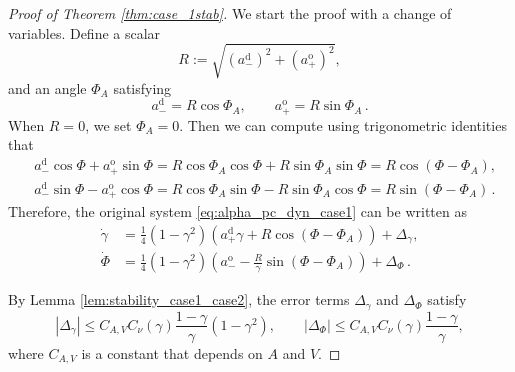 \documentclass[10pt]{article}
\theoremstyle{definition}
\theoremstyle{definition}
\numberwithin{equation}{section}
\newcommand{\aDPlus}{a_+^{\text{d}}}
\newcommand{\aDMinus}{a_-^{\text{d}}}
\newcommand{\aOPlus}{a_+^{\text{o}}}
\newcommand{\aOMinus}{a_-^{\text{o}}}
\newcommand{\DeltaGamma}{\Delta_{\gamma}}
\newcommand{\DeltaPhi}{\Delta_{\Phi}}
\newcommand{\PhiA}{\Phi_{A}}
\begin{document}
\begin{proof}[Proof of Theorem \ref{thm:case_1stab}]
We start the proof with a change of variables.
Define a scalar
\begin{equation*}
    R := \sqrt{(\aDMinus)^2 + (\aOPlus)^2},
\end{equation*}
and an angle $\PhiA$ satisfying
\begin{equation*}
\aDMinus = R \cos \PhiA, \qquad \aOPlus = R \sin \PhiA \, .
\end{equation*}
When $R=0$, we set $\PhiA = 0$.
Then we can compute using trigonometric identities that
\begin{equation*}
\begin{aligned}
&\aDMinus \cos \Phi + \aOPlus \sin \Phi = R \cos \PhiA  \cos \Phi + R \sin \PhiA \sin \Phi = R \cos (\Phi - \PhiA),\\[4pt]
&\aDMinus \sin \Phi - \aOPlus \cos \Phi = R \cos \PhiA \sin \Phi - R \sin \PhiA \cos \Phi = R \sin (\Phi - \PhiA) \, .
\end{aligned}
\end{equation*}
Therefore, the original system \eqref{eq:alpha_pc_dyn_case1} can be written as
\begin{equation}\label{eq:case1_stab_pc_dyn_app}
\begin{aligned}
\dot{\gamma} &= \frac{1}{4}(1 - \gamma^2) \left( \aDPlus \gamma + R \cos (\Phi - \PhiA) \right) + \DeltaGamma,\\
\dot{\Phi} &= \frac{1}{4} (1 - \gamma^2) \left( \aOMinus - \frac{R}{\gamma} \sin (\Phi - \PhiA) \right) + \DeltaPhi \, .
\end{aligned}
\end{equation}

By Lemma \ref{lem:stability_case1_case2}, the error terms $\DeltaGamma$ and $\DeltaPhi$ satisfy
\begin{equation*}
|\DeltaGamma| \leq C_{A,V} C_{\nu}(\gamma) \frac{1 - \gamma}{\gamma} (1 - \gamma^2), \qquad |\DeltaPhi| \leq C_{A, V} C_{\nu} (\gamma) \frac{1 - \gamma}{\gamma},
\end{equation*}
where $C_{A,V}$ is a constant that depends on $A$ and $V$.


\end{proof}
\end{document}
